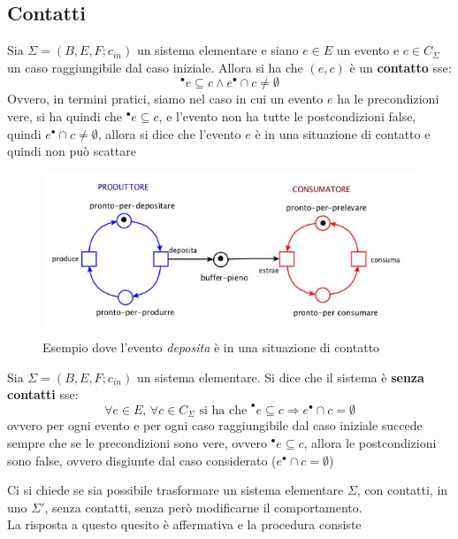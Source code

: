 \documentclass[a4paper,12pt, oneside]{book}
\begin{document}
\subsection{Contatti}
\begin{definizione}
  Sia $\Sigma = (B,E,F;c_{in})$ un sistema elementare e siano $e\in E$ un evento
  e $c\in C_\Sigma$ un caso raggiungibile dal caso iniziale. Allora si ha che
  $(e,c)$ è un \textbf{contatto} sse:
  \[^\bullet e\subseteq c \wedge e^\bullet \cap c \neq\emptyset\]
  Ovvero, in termini pratici, siamo nel caso in cui un evento $e$ ha le
  precondizioni vere, si ha quindi che $^\bullet e\subseteq c$, e l'evento non
  ha tutte le postcondizioni false, quindi $e^\bullet \cap c \neq\emptyset$,
  allora si dice che l'evento $e$ è in una situazione di contatto e quindi non
  può scattare
  \begin{figure}[H]
    \centering
    \includegraphics[scale = 0.6]{img/con.jpg}
    \caption{Esempio dove l'evento \emph{deposita} è in una situazione di
      contatto}
  \end{figure}
\end{definizione}
\begin{definizione}
  Sia $\Sigma = (B,E,F;c_{in})$ un sistema elementare. Si dice che il sistema è
  \textbf{senza contatti} sse:
  \[\forall e\in E,\,\forall c\in C_\Sigma\mbox{ si ha che } ^\bullet
    e\subseteq c\Rightarrow e^\bullet\cap c=\emptyset\]
  ovvero per ogni evento e per ogni caso raggiungibile dal caso iniziale succede
  sempre che se le precondizioni sono vere, ovvero $^\bullet e\subseteq c$,
  allora le postcondizioni sono false, ovvero disgiunte dal caso considerato
  ($e^\bullet\cap c=\emptyset$)
\end{definizione}
Ci si chiede se sia possibile trasformare un sistema elementare $\Sigma$, con
contatti, in uno $\Sigma'$, senza contatti, senza però modificarne il
comportamento.\\
La risposta a questo quesito è affermativa e la procedura consiste
\end{document}
